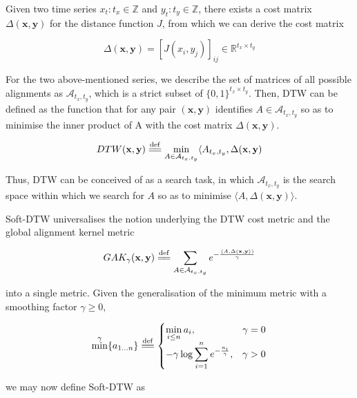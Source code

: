 \documentclass{article}
\newcommand{\eqdef}{\overset{\mathrm{def}}{=\joinrel=}}
\begin{document}
Given two time series $x_t: t_x \in \mathbb{Z}$ and $y_t: t_y \in \mathbb{Z}$, there exists a cost matrix $\Delta(\mathbf{x}, \mathbf{y})$ for the distance function $J$, from which we can derive the cost matrix 

\begin{equation}
	\Delta(\mathbf{x}, \mathbf{y}) = [J(x_i, y_j)]_{ij} \in \mathbb{R}^{t_x \times t_y} 
\end{equation}

For the two above-mentioned series, we describe the set of matrices of all possible alignments as $\mathcal{A}_{t_x, t_y}$, which is a strict subset of $\{0, 1\}^{t_x \times t_y}$. Then, DTW can be defined as the function that for any pair $(\mathbf{x}, \mathbf{y})$ identifies $A \in \mathcal{A}_{t_x, t_y}$ so as to minimise the inner product of A with the cost matrix $\Delta(\mathbf{x}, \mathbf{y})$.

\begin{equation}
	DTW(\mathbf{x}, \mathbf{y}) \eqdef \min_{A \in \mathcal{A}_{t_x, t_y}} \langle A_{t_x, t_y}, \Delta(\mathbf{x}, \mathbf{y})
\end{equation}

Thus, DTW can be conceived of as a search task, in which $\mathcal{A}_{t_x, t_y}$ is the search space within which we search for $A$ so as to minimise $\langle A, \Delta(\mathbf{x}, \mathbf{y}) \rangle$. 

Soft-DTW universalises the notion underlying the DTW cost metric and the global alignment kernel metric

\begin{equation}
	GAK_{\gamma}(\mathbf{x}, \mathbf{y}) \eqdef \sum_{A \in \mathcal{A}_{t_x, t_y}} e^{- \frac{\langle A, \Delta(\mathbf{x}, \mathbf{y} \rangle)}{\gamma}}
	\label{eq:gak}
\end{equation}

\noindent into a single metric.\cite{janati2020spatio} Given the generalisation of the minimum metric with a smoothing factor $\gamma \geq 0$,

\begin{equation}
	\min^{\gamma} \{a_{1 \ldots n}\} \eqdef 
	\begin{cases}
		\displaystyle \min_{i \leq n} a_i, 								& \gamma = 0 \\
		- \gamma \log \displaystyle \sum_{i=1}^n e^{-\frac{a_i}{\gamma}},	& \gamma > 0
	\end{cases}
\end{equation}

\noindent we may now define Soft-DTW as
\end{document}
